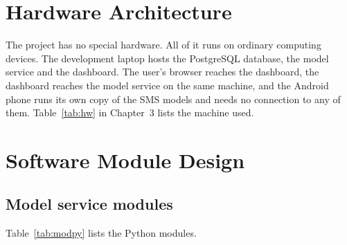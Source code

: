 {\section{Hardware Architecture}
The project has no special hardware. All of it runs on ordinary computing devices. The development laptop hosts the PostgreSQL database, the model service and the dashboard. The user's browser reaches the dashboard, the dashboard reaches the model service on the same machine, and the Android phone runs its own copy of the SMS models and needs no connection to any of them. Table~\ref{tab:hw} in Chapter~3 lists the machine used.

\section{Software Module Design}
\subsection{Model service modules}
Table~\ref{tab:modpy} lists the Python modules.

}
